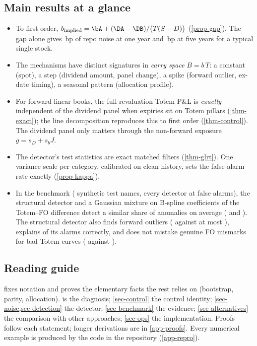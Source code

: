 \subsection{Main results at a glance}
\begin{insight}
\begin{itemize}[leftmargin=12pt]
\item To first order, $b_{\text{implied}} = \bA + (\DA - \DB)/\bigl(T(S-D)\bigr)$ (\cref{prop-gap}). The gap alone
gives \vGapOneY\,bp of repo noise at one year and \vGapFiveY\,bp at five years for a typical single stock.
\item The mechanisms have distinct signatures in \emph{carry space} $B=b\,T$: a constant (spot), a step (dividend
amount, panel change), a spike (forward outlier, ex-date timing), a seasonal pattern (allocation profile).
\item For forward-linear books, the full-revaluation Totem P\&L is \emph{exactly} independent of the dividend panel
when expiries sit on Totem pillars (\cref{thm-exact}); the line decomposition reproduces this to first order
(\cref{thm-control}). The dividend panel only matters through the non-forward exposure $g = s_D + s_b J$.
\item The detector's test statistics are exact matched filters (\cref{thm-glrt}). One variance scale per category,
calibrated on clean history, sets the false-alarm rate exactly (\cref{prop-kappa}).
\item In the benchmark (\vNTest{} synthetic test names, every detector at \vFPR{} false alarms), the structural
detector and a Gaussian mixture on B-spline coefficients of the Totem--FO difference detect a similar share of
anomalies on average (\vMeanStruct{} and \vMeanGmmDiff). The structural detector also finds forward
outliers (\vFwdStruct{} against at most \vFwdShape), explains \vAttr{} of its alarms correctly, and does not mistake
genuine FO mismarks for bad Totem curves (\vFoStruct{} against \vFoGmmDiff).
\end{itemize}
\end{insight}

\subsection{Reading guide}
 fixes notation and proves the elementary facts the rest relies on (bootstrap, parity,
allocation).  is the diagnosis; \cref{sec-control} the control identity; \cref{sec-noise,sec-detection}
the detector; \cref{sec-benchmark} the evidence; \cref{sec-alternatives} the comparison with other approaches;
\cref{sec-ops} the implementation. Proofs follow each statement; longer derivations are in \cref{app-proofs}.
Every numerical example is produced by the code in the repository (\cref{app-repro}).
